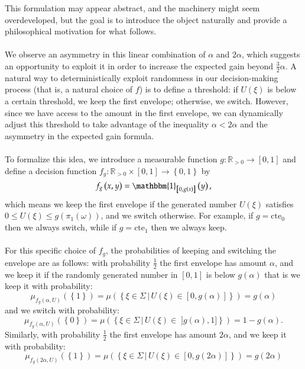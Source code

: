 \documentclass[11pt, a4paper, oneside]{article}
\theoremstyle{remark}
\theoremstyle{lemma}
\begin{document}
This formulation may appear abstract, and the machinery might seem overdeveloped, but the goal is to introduce the object naturally and provide a philosophical motivation for what follows.  
\\\\
We observe an asymmetry in this linear combination of \(\alpha\) and \(2\alpha\), which suggests an opportunity to exploit it in order to increase the expected gain beyond \(\frac{3}{2}\alpha\). A natural way to deterministically exploit randomness in our decision-making process (that is, a natural choice of \(f\)) is to define a threshold: if \( U\left(\xi\right) \) is below a certain threshold, we keep the first envelope; otherwise, we switch. However, since we have access to the amount in the first envelope, we can dynamically adjust this threshold to take advantage of the inequality \(\alpha < 2\alpha\) and the asymmetry in the expected gain formula.
\\\\
To formalize this idea, we introduce a measurable function \( g: \mathbb{R}_{>0} \to \left[0,1\right] \) and define a decision function \( f_g: \mathbb{R}_{>0} \times \left[0,1\right] \to \left\{0,1\right\} \) by
\[
f_g\left(x, y\right) = \mathbbm{1}_{\left[0, g\left(x\right)\right]}\left(y\right),
\]
which means we keep the first envelope if the generated number \( U\left(\xi\right) \) satisfies \(0\leq  U\left(\xi\right) \leq g\left(\pi_1\left(\omega\right)\right) \), and we switch otherwise. For example, if $g=\text{cte}_0$ then we always switch, while if $g=\text{cte}_1$ then we always keep. 
\\\\
For this specific choice of \( f_g \), the probabilities of keeping and switching the envelope are as follows:
with probability \(\frac{1}{2}\) the first envelope has amount \(\alpha\), and we keep it if the randomly generated number in $\left[0,1\right]$ is below $g\left(\alpha\right)$ that is we keep it with probability:
\[
\mu_{f_g\left(\alpha, U\right)}\left(\left\{1\right\}\right)=\mu\left(\left\{\xi\in\Sigma\,|\, U\left(\xi\right)\in\left[0,g\left(\alpha\right)\right]\right\}\right)=g\left(\alpha\right)
\]
and we switch with probability:
\[
\mu_{f_g\left(\alpha, U\right)}\left(\left\{0\right\}\right)=\mu\left(\left\{\xi\in\Sigma\,|\, U\left(\xi\right)\in\;]g\left(\alpha\right),1]\right\}\right)=1-g\left(\alpha\right).
\]
Similarly, with probability \(\frac{1}{2}\) the first envelope has amount $2\alpha$, and we keep it with probability:
\[
\mu_{f_g\left(2\alpha, U\right)}\left(\left\{1\right\}\right)=\mu\left(\left\{\xi\in\Sigma\,|\, U\left(\xi\right)\in\left[0,g\left(2\alpha\right)\right]\right\}\right)=g\left(2\alpha\right)
\]
\end{document}
